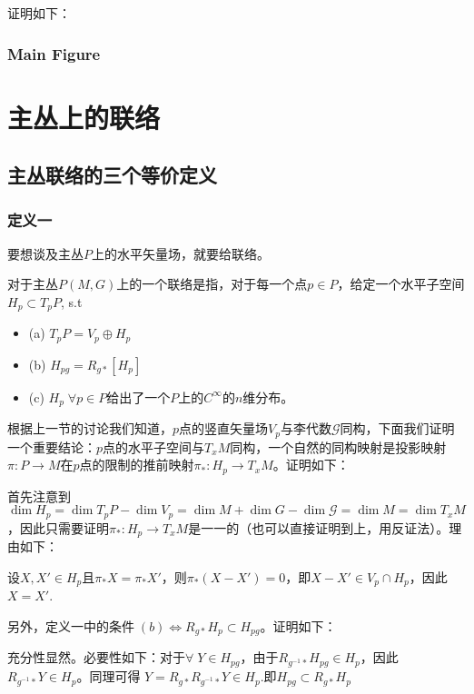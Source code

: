 \documentclass{ctexbook}
\begin{document}
证明如下：





\subsection{Main Figure}


\chapter{主丛上的联络}

\section{主丛联络的三个等价定义}

\subsection{定义一}

要想谈及主丛$P$上的水平矢量场，就要给联络。

对于主丛$P(M,G)$上的一个联络是指，对于每一个点$p\in P$，给定一个水平子空间$H_p\subset T_pP$, s.t
\begin{itemize}
    \item (a) $T_pP=V_p\oplus H_p$
    \item (b) $H_{pg}=R_{g*}[H_p]$
    \item (c) $H_p\;\forall p\in P$给出了一个$P$上的$C^{\infty}$的$n$维分布。
\end{itemize}

根据上一节的讨论我们知道，$p$点的竖直矢量场$V_p$与李代数$\mathscr{G}$同构，下面我们证明一个重要结论：$p$点的水平子空间与$T_x M$同构，一个自然的同构映射是投影映射$\pi\colon  P\to M$在$p$点的限制的推前映射$\pi_{*}\colon  H_{p}\to T_x M$。证明如下：

首先注意到$\dim{H_p}=\dim{T_p P}-\dim{V_p}=\dim{M}+\dim{G}-\dim{\mathscr{G}}=\dim{M}=\dim{T_x M}$，因此只需要证明$\pi_{*}\colon  H_{p}\to T_x M$是一一的（也可以直接证明到上，用反证法）。理由如下：

设$X,X'\in H_p$且$\pi_{*}X=\pi_{*}X'$，则$\pi_{*}(X-X')=0$，即$X-X'\in V_p\cap H_p$，因此$X=X'$.

另外，$\text{定义一中的条件}\;(b)\Leftrightarrow R_{g*}H_p\subset H_{pg}$。证明如下：

充分性显然。必要性如下：对于$\forall\;Y\in H_{pg}$，由于$R_{g^{-1}*}H_{pg}\in H_p$，因此$R_{g^{-1}*}Y\in H_p$。同理可得 $Y=R_{g*}R_{g^{-1}*}Y\in H_p$.即$H_{pg}\subset R_{g*}H_p $
\end{document}
